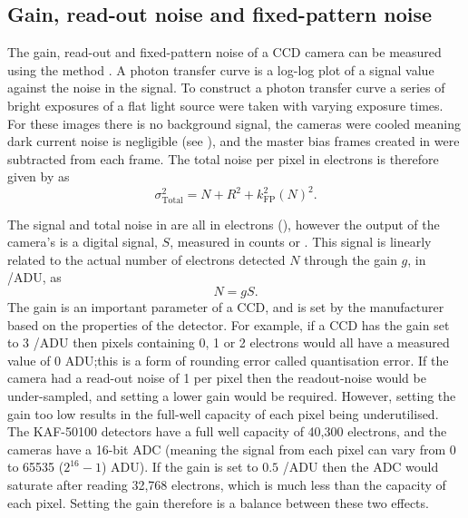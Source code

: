 \subsection{Gain, read-out noise and fixed-pattern noise}
\label{sec:ptc}
\begin{colsection}

The gain, read-out and fixed-pattern noise of a CCD camera can be measured using the  method \citep{CCDs, PTC}. A photon transfer curve is a log-log plot of a signal value against the noise in the signal. To construct a photon transfer curve a series of bright exposures of a flat light source were taken with varying exposure times. For these images there is no background signal, the cameras were cooled meaning dark current noise is negligible (see ), and the master bias frames created in  were subtracted from each frame. The total noise per pixel in electrons is therefore given by  as
%
\begin{equation}
    \sigma_\text{Total}^2 = N + R^2 + k_\text{FP}^2{(N)}^2.
    \label{eq:noise_2}
\end{equation}

The signal and total noise in  are all in electrons (\elec), however the output of the camera's  is a digital signal, $S$, measured in counts or . This signal is linearly related to the actual number of electrons detected $N$ through the gain $g$, in \elec/ADU, as
%
\begin{equation}
    N = g S.
    \label{eq:gain}
\end{equation}
%
The gain is an important parameter of a CCD, and is set by the manufacturer based on the properties of the detector. For example, if a CCD has the gain set to 3 \elec/ADU then pixels containing 0, 1 or 2 electrons would all have a measured value of 0 ADU;\@ this is a form of rounding error called quantisation error. If the camera had a read-out noise of 1 \elec{} per pixel then the readout-noise would be under-sampled, and setting a lower gain would be required. However, setting the gain too low results in the full-well capacity of each pixel being underutilised. The KAF-50100 detectors have a full well capacity of 40,300 electrons, and the cameras have a 16-bit ADC (meaning the signal from each pixel can vary from 0 to 65535 ($2^{16}-1$) ADU). If the gain is set to $0.5$ \elec/ADU then the ADC would saturate after reading 32,768 electrons, which is much less than the capacity of each pixel. Setting the gain therefore is a balance between these two effects.


\end{colsection}
